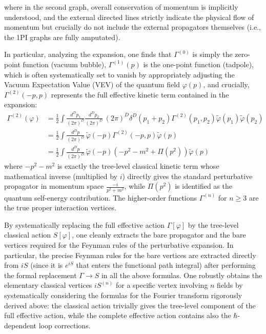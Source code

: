 where in the second graph, overall conservation of momentum is implicitly understood, and the external directed lines strictly indicate the physical flow of momentum but crucially do not include the external propagators themselves (i.e., the 1PI graphs are fully amputated).

In particular, analyzing the expansion, one finds that $\Gamma^{(0)}$ is simply the zero-point function (vacuum bubble), $\Gamma^{(1)}(p)$ is the one-point function (tadpole), which is often systematically set to vanish by appropriately adjusting the Vacuum Expectation Value (VEV) of the quantum field $\varphi(p)$, and crucially, $\Gamma^{(2)}(-p, p)$ represents the full effective kinetic term contained in the expansion:
\begin{equation} \label{eq:effective_kinetic_term}
    \begin{aligned}
        \Gamma^{(2)}(\varphi) & = \frac{1}{2} \int \frac{d^D p_1}{(2\pi)^D} \frac{d^D p_2}{(2\pi)^D} \, (2\pi)^D \delta^D(p_1 + p_2) \Gamma^{(2)}(p_1, p_2) \tilde{\varphi}(p_1) \tilde{\varphi}(p_2) \\
                              & = \frac{1}{2} \int \frac{d^D p}{(2\pi)^D} \, \tilde{\varphi}(-p) \Gamma^{(2)}(-p, p) \tilde{\varphi}(p)                                                               \\
                              & = \frac{1}{2} \int \frac{d^D p}{(2\pi)^D} \, \tilde{\varphi}(-p) \left( -p^2 - m^2 + \Pi(p^2) \right) \tilde{\varphi}(p)
    \end{aligned}
\end{equation}
where $-p^2 - m^2$ is exactly the tree-level classical kinetic term whose mathematical inverse (multiplied by $i$) directly gives the standard perturbative propagator in momentum space $\frac{-i}{p^2 + m^2}$, while $\Pi(p^2)$ is identified as the quantum self-energy contribution. The higher-order functions $\Gamma^{(n)}$ for $n \ge 3$ are the true proper interaction vertices.

By systematically replacing the full effective action $\Gamma[\varphi]$ by the tree-level classical action $S[\varphi]$, one cleanly extracts the bare propagator and the bare vertices required for the Feynman rules of the perturbative expansion. In particular, the precise Feynman rules for the bare vertices are extracted directly from $iS$ (since it is $e^{iS}$ that enters the functional path integral) after performing the formal replacement $\Gamma \rightarrow S$ in all the above formulas. One robustly obtains the elementary classical vertices $iS^{(n)}$ for a specific vertex involving $n$ fields by systematically considering the formulas for the Fourier transform rigorously derived above: the classical action trivially gives the tree-level component of the full effective action, while the complete effective action contains also the $\hbar$-dependent loop corrections.

